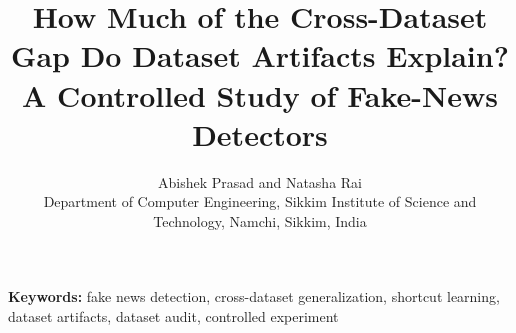 \documentclass[11pt]{article}
\begin{document}
\title{How Much of the Cross-Dataset Gap Do Dataset Artifacts Explain? A Controlled Study of Fake-News Detectors}
\author{Abishek Prasad and Natasha Rai\\Department of Computer Engineering, Sikkim Institute of Science and Technology, Namchi, Sikkim, India}
\date{}
\maketitle
\begin{abstract}\end{abstract}
\noindent\textbf{Keywords:} fake news detection, cross-dataset generalization, shortcut learning, dataset artifacts, dataset audit, controlled experiment













\end{document}
